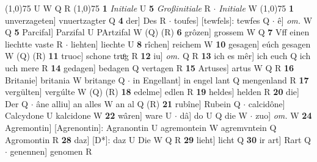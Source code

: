 \documentclass[8pt,a4paper,notitlepage]{article}
\begin{document}
\begin{table}[ht]
\begin{minipage}[t]{0.5\linewidth}
\scriptsize
\line(1,0){75} \newline
U W Q R \newline
\line(1,0){75} \newline
\textbf{1} \textit{Initiale} U  \textbf{5} \textit{Großinitiale} R   $\cdot$ \textit{Initiale} W  \newline
\line(1,0){75} \newline
\textbf{1} unverzageten] vnuertzagter Q \textbf{4} der] Des R  $\cdot$ toufes] [tewfels]: tewfes Q  $\cdot$ ê] \textit{om.} W Q \textbf{5} Parcifal] Parzifal U PArtzifal W (Q) (R) \textbf{6} grôzen] grossem W Q \textbf{7} Vff einen liechtte vaste R  $\cdot$ liehten] liechte U \textbf{8} rîchen] reichem W \textbf{10} gesagen] eúch gesagen W (Q) (R) \textbf{11} truoc] schone truͦg R \textbf{12} iu] \textit{om.} Q R \textbf{13} ich es mêr] ich euch Q ich uch mere R \textbf{14} gedagen] bedagen Q vertagen R \textbf{15} Artuses] artus W Q R \textbf{16} Britanie] britania W britange Q  $\cdot$ in Engellant] in engel lant Q mengenland R \textbf{17} vergülten] vergúlte W (Q) (R) \textbf{18} edelme] edlen R \textbf{19} heldes] helden R \textbf{20} die] Der Q  $\cdot$ âne alliu] an alles W an al Q (R) \textbf{21} rubîne] Rubein Q  $\cdot$ calcidône] Calcydone U kalcidone W \textbf{22} wâren] ware U  $\cdot$ dâ] do U Q die W  $\cdot$ zuo] \textit{om.} W \textbf{24} Agremontin] [Agrenontin]: Agranontin U agremontein W agremvntein Q Agromontin R \textbf{28} daz] [D*]: daz U Die W Q R \textbf{29} lieht] licht Q \textbf{30} ir art] Rart Q  $\cdot$ genennen] genomen R \newline
\end{minipage}
\end{table}
\end{document}
